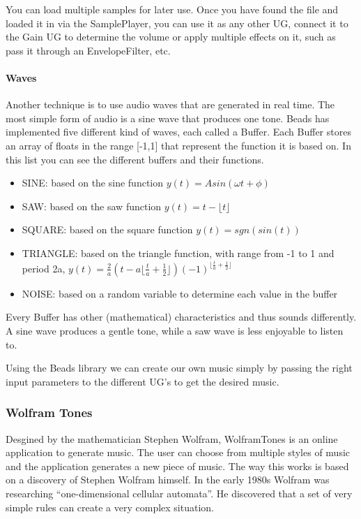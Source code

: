 \documentclass[12pt]{article}
\newcommand\floor[1]{\lfloor#1\rfloor}
\begin{document}
You can load multiple samples for later use. Once you have found the file and loaded it in via the SamplePlayer, you can use it as any other UG, connect it to the Gain UG to determine the volume or apply multiple effects on it, such as pass it through an EnvelopeFilter, etc.  

\paragraph{Waves}

Another technique is to use audio waves that are generated in real time. The most simple form of audio is a sine wave that produces one tone. Beads has implemented five different kind of waves, each called a Buffer. Each Buffer stores an array of floats in the range [-1,1] that represent the function it is based on. In this list you can see the different buffers and their functions.
\begin{itemize}
\item SINE:  based on the sine function $y(t) = A sin (\omega t + \phi)$
\item SAW: based on the saw function $y(t) = t - \floor{t}$
\item SQUARE: based on the square function $y(t) = sgn(sin(t))$
\item TRIANGLE: based on the triangle function, with range from -1 to 1 and period 2a, $y(t) = \frac{2}{a}(t - a \floor{\frac{t}{a} + \frac{1}{2}}) (-1)^{\floor{\frac{t}{a} + \frac{1}{2}}}$
\item NOISE: based on a random variable to determine each value in the buffer
\end{itemize} 

Every Buffer has other (mathematical) characteristics and thus sounds differently. A sine wave produces a gentle tone, while a saw wave is less enjoyable to listen to.
\newline

Using the Beads library we can create our own music simply by passing the right input parameters to the different UG's to get the desired music.

\subsubsection{Wolfram Tones}

Desgined by the mathematician Stephen Wolfram, WolframTones is an online application to generate music. The user can choose from multiple styles of music and the application generates a new piece of music. The way this works is based on a discovery of Stephen Wolfram himself. In the early 1980s Wolfram was researching ``one-dimensional cellular automata''. He discovered that a set of very simple rules can create a very complex situation. 
\newline
\end{document}
